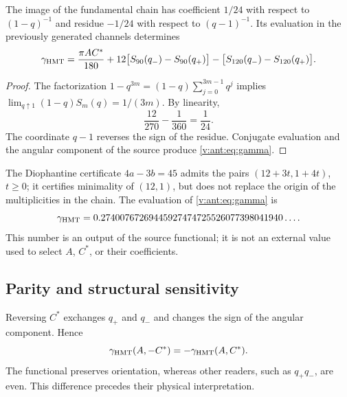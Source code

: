 \begin{theorem}
The image of the fundamental chain has coefficient $1/24$
with respect to $(1-q)^{-1}$ and residue $-1/24$ with respect to $(q-1)^{-1}$.
Its evaluation in the previously generated channels determines
\begin{equation}
\gamma_{\mathrm{HMT}}=
\frac{\pi AC^*}{180}
+12\bigl[S_{90}(q_-)-S_{90}(q_+)\bigr]
-\bigl[S_{120}(q_-)-S_{120}(q_+)\bigr].
\label{v:ant:eq:gamma}
\end{equation}
\end{theorem}
\begin{proof}
The factorization $1-q^{3m}=(1-q)\sum_{j=0}^{3m-1}q^j$ implies
$\lim_{q\uparrow1}(1-q)S_m(q)=1/(3m)$. By linearity,
\[
\frac{12}{270}-\frac1{360}=\frac1{24}.
\]
The coordinate $q-1$ reverses the sign of the residue.
Conjugate evaluation and the angular component of the source
produce \eqref{v:ant:eq:gamma}.
\end{proof}

The Diophantine certificate $4a-3b=45$ admits the pairs
$(12+3t,1+4t)$, $t\ge0$; it certifies minimality of $(12,1)$,
but does not replace the origin of the multiplicities in the chain.
The evaluation of \eqref{v:ant:eq:gamma} is
\[
\gamma_{\mathrm{HMT}}
=0.27400767269445927474725526077398041940\ldots.
\]
This number is an output of the source functional; it is not an external value
used to select $A$, $C^*$, or their coefficients.

\subsection{Parity and structural sensitivity}
Reversing $C^*$ exchanges $q_+$ and $q_-$ and changes the sign
of the angular component. Hence
\[
\gamma_{\mathrm{HMT}}(A,-C^*)=-\gamma_{\mathrm{HMT}}(A,C^*).
\]
The functional preserves orientation, whereas other readers,
such as $q_+q_-$, are even. This difference precedes their physical interpretation.
